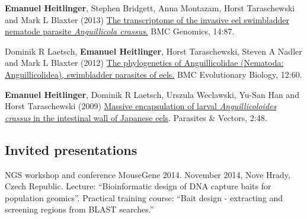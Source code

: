 \documentclass[10pt,a4paper]{article}
\renewenvironment{itemize}{
  \begin{list}{}{
    \setlength{\leftmargin}{2.5em}
    \setlength{\itemsep}{0.25em}
    \setlength{\parskip}{0pt}
    \setlength{\parsep}{0.25em}
  }
}{
  \end{list}
}
\begin{document}
\begin{itemize}
\item \textbf{Emanuel Heitlinger}, Stephen Bridgett, Anna Montazam,
  Horst Taraschewski and Mark L Blaxter (2013)
  \href{http://www.biomedcentral.com/1471-2164/14/87}{The
    transcriptome of the invasive eel swimbladder nematode parasite
    \textit{Anguillicola crassus}.} BMC Genomics, 
  14:87.

\item Dominik R Laetsch, \textbf{Emanuel Heitlinger}, Horst
  Taraschewski, Steven A Nadler and Mark L Blaxter (2012)
  \href{http://www.biomedcentral.com/1471-2148/12/60} {The
    phylogenetics of Anguillicolidae (Nematoda: Anguillicolidea),
    swimbladder parasites of eels.} BMC Evolutionary Biology,
  12:60.

\item \textbf{Emanuel Heitlinger}, Dominik R Laetsch, Urszula
  Weclawski, Yu-San Han and Horst Taraschewski (2009)
  \href{http://www.parasitesandvectors.com/content/2/1/48}{Massive
    encapsulation of larval \textit{Anguillicoloides crassus} in the
    intestinal wall of Japanese eels}. Parasites \& Vectors,
  2:48.
\end{itemize}

%



\subsection*{Invited presentations}

\begin{itemize}

\item NGS workshop and conference MouseGene 2014. November 2014, Nove
  Hrady, Czech Republic. Lecture: ``Bioinformatic design of DNA
  capture baits for population geomics''. Practical training course:
  ``Bait design - extracting and screening regions from BLAST
  searches.''

\end{itemize}
\end{document}
